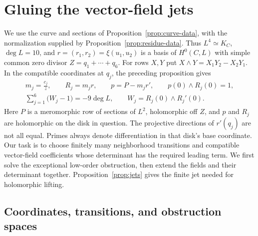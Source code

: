 \section{Gluing the vector-field jets}\label{jets:section}

We use the curve and sections of Proposition~\ref{prop:curve-data},
with the normalization supplied by Proposition~\ref{prop:residue-data}.
Thus $L^4\simeq K_C$, $\deg L=10$, and
$r=(r_1,r_2)=\xi(u_1,u_2)$ is a basis of $H^0(C,L)$ with simple common
zero divisor $Z=q_1+\cdots+q_6$.
For rows $X,Y$ put $X\wedge Y=X_1Y_2-X_2Y_1$.
In the compatible coordinates at $q_j$, the preceding proposition gives
\begin{equation}\label{jets:residue-input}
 \begin{gathered}
 m_j=\frac{c_j}{z},\qquad R_j=m_jr,\qquad p=P-m_jr',\qquad
 p(0)\wedge R_j(0)=1,\\
 \sum_{j=1}^6\bigl(W_j-1\bigr)=-9\deg L,
 \qquad W_j=R_j(0)\wedge R_j'(0).
 \end{gathered}
\end{equation}
Here $P$ is a meromorphic row of sections of $L^2$, holomorphic off $Z$,
and $p$ and $R_j$ are holomorphic on the disk in question.
The projective directions of $r'(q_j)$ are not all equal.
Primes always denote differentiation in that disk's base coordinate.
Our task is to choose finitely many neighborhood transitions and compatible
vector-field coefficients whose determinant has the required leading term.
We first solve the exceptional low-order obstruction, then extend the fields
and their determinant together. Proposition~\ref{prop:jets} gives the finite
jet needed for holomorphic lifting.

\subsection{Coordinates, transitions, and obstruction spaces}

